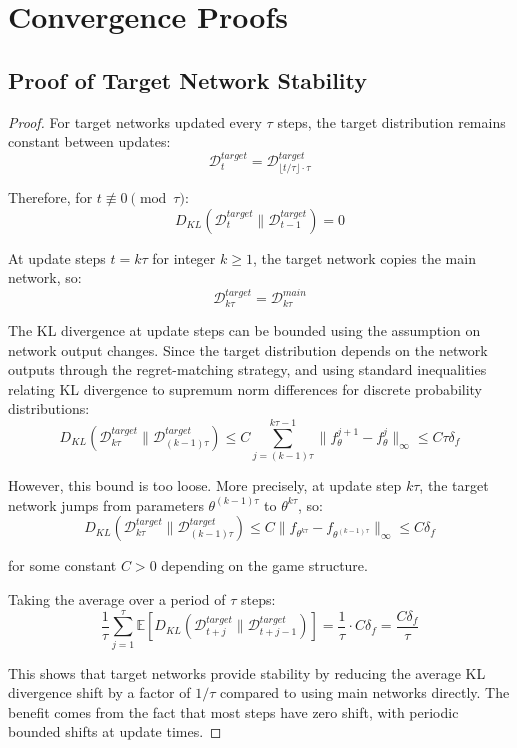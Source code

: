 \documentclass[12pt,a4paper]{article}
\begin{document}
\section{Convergence Proofs}

\subsection{Proof of Target Network Stability}

\begin{proof}
For target networks updated every $\tau$ steps, the target distribution remains constant between updates:
$$\mathcal{D}_t^{target} = \mathcal{D}_{\lfloor t/\tau \rfloor \cdot \tau}^{target}$$

Therefore, for $t \not\equiv 0 \pmod{\tau}$:
$$D_{KL}(\mathcal{D}_t^{target} \| \mathcal{D}_{t-1}^{target}) = 0$$

At update steps $t = k\tau$ for integer $k \geq 1$, the target network copies the main network, so:
$$\mathcal{D}_{k\tau}^{target} = \mathcal{D}_{k\tau}^{main}$$

The KL divergence at update steps can be bounded using the assumption on network output changes. Since the target distribution depends on the network outputs through the regret-matching strategy, and using standard inequalities relating KL divergence to supremum norm differences for discrete probability distributions:
$$D_{KL}(\mathcal{D}_{k\tau}^{target} \| \mathcal{D}_{(k-1)\tau}^{target}) \leq C \sum_{j=(k-1)\tau}^{k\tau-1} \|f_\theta^{j+1} - f_\theta^{j}\|_\infty \leq C \tau \delta_f$$

However, this bound is too loose. More precisely, at update step $k\tau$, the target network jumps from parameters $\theta^{(k-1)\tau}$ to $\theta^{k\tau}$, so:
$$D_{KL}(\mathcal{D}_{k\tau}^{target} \| \mathcal{D}_{(k-1)\tau}^{target}) \leq C \|f_{\theta^{k\tau}} - f_{\theta^{(k-1)\tau}}\|_\infty \leq C \delta_f$$

for some constant $C > 0$ depending on the game structure.

Taking the average over a period of $\tau$ steps:
$$\frac{1}{\tau} \sum_{j=1}^{\tau} \mathbb{E}[D_{KL}(\mathcal{D}_{t+j}^{target} \| \mathcal{D}_{t+j-1}^{target})] = \frac{1}{\tau} \cdot C \delta_f = \frac{C \delta_f}{\tau}$$

This shows that target networks provide stability by reducing the average KL divergence shift by a factor of $1/\tau$ compared to using main networks directly. The benefit comes from the fact that most steps have zero shift, with periodic bounded shifts at update times.
\end{proof}
\end{document}
